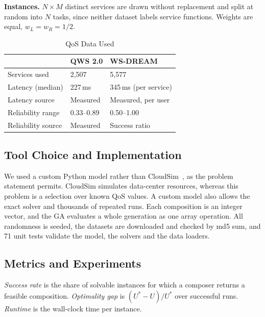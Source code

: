 \documentclass[conference]{IEEEtran}
\begin{document}
\textbf{Instances.} $N\times M$ distinct services are drawn without replacement and split at random into $N$ tasks, since neither dataset labels service functions. Weights are equal, $w_L=w_R=1/2$.

\begin{table}[t]
\centering
\caption{QoS Data Used}\label{tab:data}
\footnotesize
\begin{tabular}{lll}
\toprule
 & QWS 2.0 & WS-DREAM \\
\midrule
Services used & 2,507 & 5,577 \\
Latency (median) & 227\,ms & 345\,ms (per service) \\
Latency source & Measured & Measured, per user \\
Reliability range & 0.33--0.89 & 0.50--1.00 \\
Reliability source & Measured & Success ratio \\
\bottomrule
\end{tabular}
\end{table}

\subsection{Tool Choice and Implementation}
We used a custom Python model rather than CloudSim~\cite{calheiros2011}, as the problem statement permits. CloudSim simulates data-center resources, whereas this problem is a selection over known QoS values. A custom model also allows the exact solver and thousands of repeated runs. Each composition is an integer vector, and the GA evaluates a whole generation as one array operation. All randomness is seeded, the datasets are downloaded and checked by md5 sum, and 71 unit tests validate the model, the solvers and the data loaders.

\subsection{Metrics and Experiments}
\emph{Success rate} is the share of solvable instances for which a composer returns a feasible composition. \emph{Optimality gap} is $(U^{*}-U)/U^{*}$ over successful runs. \emph{Runtime} is the wall-clock time per instance.
\end{document}

